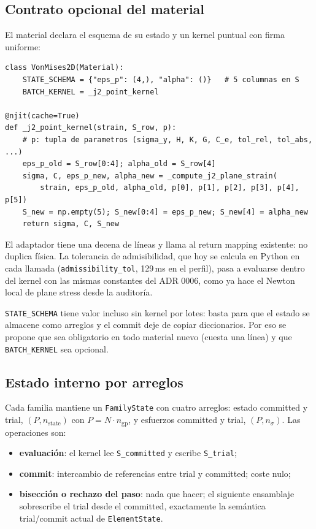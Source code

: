 \documentclass[11pt,letterpaper,oneside]{article}
\newcommand{\code}[1]{\texttt{#1}}
\begin{document}
\subsection{Contrato opcional del material}

El material declara el esquema de su estado y un kernel puntual con firma uniforme:
\begin{lstlisting}
class VonMises2D(Material):
    STATE_SCHEMA = {"eps_p": (4,), "alpha": ()}   # 5 columnas en S
    BATCH_KERNEL = _j2_point_kernel

@njit(cache=True)
def _j2_point_kernel(strain, S_row, p):
    # p: tupla de parametros (sigma_y, H, K, G, C_e, tol_rel, tol_abs, ...)
    eps_p_old = S_row[0:4]; alpha_old = S_row[4]
    sigma, C, eps_p_new, alpha_new = _compute_j2_plane_strain(
        strain, eps_p_old, alpha_old, p[0], p[1], p[2], p[3], p[4], p[5])
    S_new = np.empty(5); S_new[0:4] = eps_p_new; S_new[4] = alpha_new
    return sigma, C, S_new
\end{lstlisting}
El adaptador tiene una decena de líneas y llama al return mapping existente: no duplica física. La tolerancia de admisibilidad, que hoy se calcula en Python en cada llamada (\code{admissibility\_tol}, 129\,ms en el perfil), pasa a evaluarse dentro del kernel con las mismas constantes del ADR 0006, como ya hace el Newton local de plane stress desde la auditoría.

\code{STATE\_SCHEMA} tiene valor incluso sin kernel por lotes: basta para que el estado se almacene como arreglos y el commit deje de copiar diccionarios. Por eso se propone que sea obligatorio en todo material nuevo (cuesta una línea) y que \code{BATCH\_KERNEL} sea opcional.

\subsection{Estado interno por arreglos}

Cada familia mantiene un \code{FamilyState} con cuatro arreglos: estado committed y trial, $(P, n_{\text{state}})$ con $P = N\cdot n_{\text{gp}}$, y esfuerzos committed y trial, $(P, n_{\sigma})$. Las operaciones son:
\begin{itemize}[nosep]
  \item \textbf{evaluación}: el kernel lee \code{S\_committed} y escribe \code{S\_trial};
  \item \textbf{commit}: intercambio de referencias entre trial y committed; coste nulo;
  \item \textbf{bisección o rechazo del paso}: nada que hacer; el siguiente ensamblaje sobrescribe el trial desde el committed, exactamente la semántica trial/commit actual de \code{ElementState}.
\end{itemize}
\end{document}
